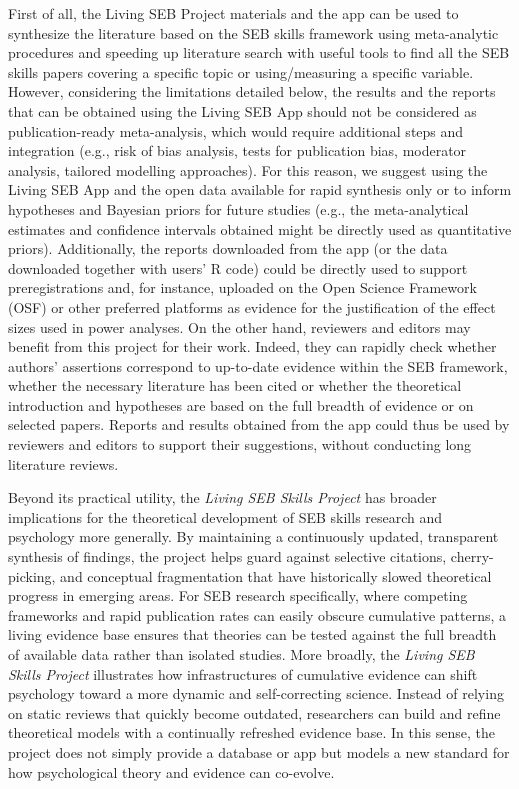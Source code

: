 \documentclass[
  man,
  longtable,
  nolmodern,
  notxfonts,
  notimes,
  colorlinks=true,linkcolor=blue,citecolor=blue,urlcolor=blue]{apa7}
\begin{document}
First of all, the Living SEB Project materials and the app can be used
to synthesize the literature based on the SEB skills framework using
meta-analytic procedures and speeding up literature search with useful
tools to find all the SEB skills papers covering a specific topic or
using/measuring a specific variable. However, considering the
limitations detailed below, the results and the reports that can be
obtained using the Living SEB App should not be considered as
publication-ready meta-analysis, which would require additional steps
and integration (e.g., risk of bias analysis, tests for publication
bias, moderator analysis, tailored modelling approaches). For this
reason, we suggest using the Living SEB App and the open data available
for rapid synthesis only or to inform hypotheses and Bayesian priors for
future studies (e.g., the meta-analytical estimates and confidence
intervals obtained might be directly used as quantitative priors).
Additionally, the reports downloaded from the app (or the data
downloaded together with users' R code) could be directly used to
support preregistrations and, for instance, uploaded on the Open Science
Framework (OSF) or other preferred platforms as evidence for the
justification of the effect sizes used in power analyses. On the other
hand, reviewers and editors may benefit from this project for their
work. Indeed, they can rapidly check whether authors' assertions
correspond to up-to-date evidence within the SEB framework, whether the
necessary literature has been cited or whether the theoretical
introduction and hypotheses are based on the full breadth of evidence or
on selected papers. Reports and results obtained from the app could thus
be used by reviewers and editors to support their suggestions, without
conducting long literature reviews.

Beyond its practical utility, the \emph{Living SEB Skills Project} has
broader implications for the theoretical development of SEB skills
research and psychology more generally. By maintaining a continuously
updated, transparent synthesis of findings, the project helps guard
against selective citations, cherry-picking, and conceptual
fragmentation that have historically slowed theoretical progress in
emerging areas. For SEB research specifically, where competing
frameworks and rapid publication rates can easily obscure cumulative
patterns, a living evidence base ensures that theories can be tested
against the full breadth of available data rather than isolated studies.
More broadly, the \emph{Living SEB Skills Project} illustrates how
infrastructures of cumulative evidence can shift psychology toward a
more dynamic and self-correcting science. Instead of relying on static
reviews that quickly become outdated, researchers can build and refine
theoretical models with a continually refreshed evidence base. In this
sense, the project does not simply provide a database or app but models
a new standard for how psychological theory and evidence can co-evolve.
\end{document}
